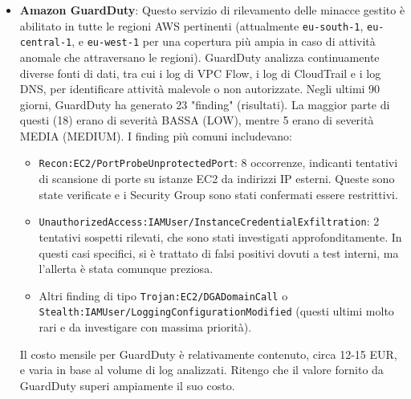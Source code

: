 \begin{itemize}
    \item \textbf{Amazon GuardDuty}: Questo servizio di rilevamento delle minacce gestito è abilitato in tutte le regioni AWS pertinenti (attualmente \texttt{eu-south-1}, \texttt{eu-central-1}, e \texttt{eu-west-1} per una copertura più ampia in caso di attività anomale che attraversano le regioni). GuardDuty analizza continuamente diverse fonti di dati, tra cui i log di VPC Flow, i log di CloudTrail e i log DNS, per identificare attività malevole o non autorizzate. Negli ultimi 90 giorni, GuardDuty ha generato 23 "finding" (risultati). La maggior parte di questi (18) erano di severità BASSA (LOW), mentre 5 erano di severità MEDIA (MEDIUM). I finding più comuni includevano:
        \begin{itemize}
            \item \texttt{Recon:EC2/PortProbeUnprotectedPort}: 8 occorrenze, indicanti tentativi di scansione di porte su istanze EC2 da indirizzi IP esterni. Queste sono state verificate e i Security Group sono stati confermati essere restrittivi.
            \item \texttt{UnauthorizedAccess:IAMUser/InstanceCredentialExfiltration}: 2 tentativi sospetti rilevati, che sono stati investigati approfonditamente. In questi casi specifici, si è trattato di falsi positivi dovuti a test interni, ma l'allerta è stata comunque preziosa.
            \item Altri finding di tipo \texttt{Trojan:EC2/DGADomainCall} o \texttt{Stealth:IAMUser/LoggingConfigurationModified} (questi ultimi molto rari e da investigare con massima priorità).
        \end{itemize}
        Il costo mensile per GuardDuty è relativamente contenuto, circa 12-15 EUR, e varia in base al volume di log analizzati. Ritengo che il valore fornito da GuardDuty superi ampiamente il suo costo.
    

\end{itemize}
